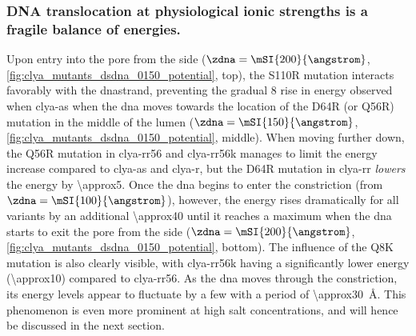 \subsubsection{DNA translocation at physiological ionic strengths is a fragile balance of energies.}
%

Upon entry into the pore from the \cisi{} side ($\zdna = \mSI{200}{\angstrom}$,
\cref{fig:clya_mutants_dsdna_0150_potential}, top), the S110R mutation interacts favorably with the
\gls{dna}strand, preventing the gradual \SI{+8}{\kT} rise in energy observed when \gls{clya-as} when the
\gls{dna} moves towards the location of the  D64R (or Q56R) mutation in the middle of the lumen ($\zdna =
\mSI{150}{\angstrom}$, \cref{fig:clya_mutants_dsdna_0150_potential}, middle). When moving further down, the
Q56R mutation in \gls{clya-rr56} and \gls{clya-rr56k} manages to limit the energy increase compared to
\gls{clya-as} and \gls{clya-r}, but the D64R mutation in \gls{clya-rr} \emph{lowers} the energy by
\SI{\approx5}{\kT}. Once the \gls{dna} begins to enter the constriction (from $\zdna = \mSI{100}{\angstrom}$),
however, the energy rises dramatically for all variants by an additional \SI{\approx40}{\kT} until it reaches
a maximum when the \gls{dna} starts to exit the pore from the \transi{} side ($\zdna = \mSI{200}{\angstrom}$,
\cref{fig:clya_mutants_dsdna_0150_potential}, bottom). The influence of the Q8K mutation is also clearly
visible, with \gls{clya-rr56k} having a significantly lower energy (\SI{\approx10}{\kT}) compared to
\gls{clya-rr56}. As the \gls{dna} moves through the constriction, its energy levels appear to fluctuate by a
few \si{\kT} with a period of \SI{\approx30}{\angstrom}. This phenomenon is even more prominent at high salt
concentrations, and will hence be discussed in the next section. 

